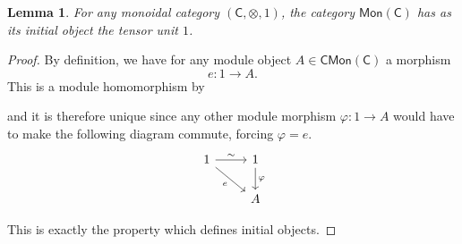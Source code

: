 \documentclass[a4paper,10pt]{scrreprt}
\theoremstyle{definition}
\theoremstyle{plain}
\newtheorem{lemma}{Lemma}[section]
\theoremstyle{remark}
\begin{document}
\begin{lemma}
  \label{lemma:unitobjectisinitialincmon}
  For any monoidal category $(\mathsf{C}, \otimes, 1)$, the category $\mathsf{Mon}(\mathsf{C})$ has as its initial object the tensor unit $1$.
\end{lemma}
\begin{proof}
  By definition, we have for any module object $A \in \mathsf{CMon}(\mathsf{C})$ a morphism 
  \begin{equation*}
    e\colon 1 \to A.
  \end{equation*}
  This is a module homomorphism by

  and it is therefore unique since any other module morphism $\varphi\colon 1 \to A$ would have to make the following diagram commute, forcing $\varphi = e$.
  \begin{equation*}
    \begin{tikzcd}
      1
      \arrow[r, "\sim"]
      \arrow[dr, swap, "e"]
      & 1
      \arrow[d, "\varphi"]
      \\
      & A
    \end{tikzcd}
  \end{equation*}

  This is exactly the property which defines initial objects.
\end{proof}
\end{document}

